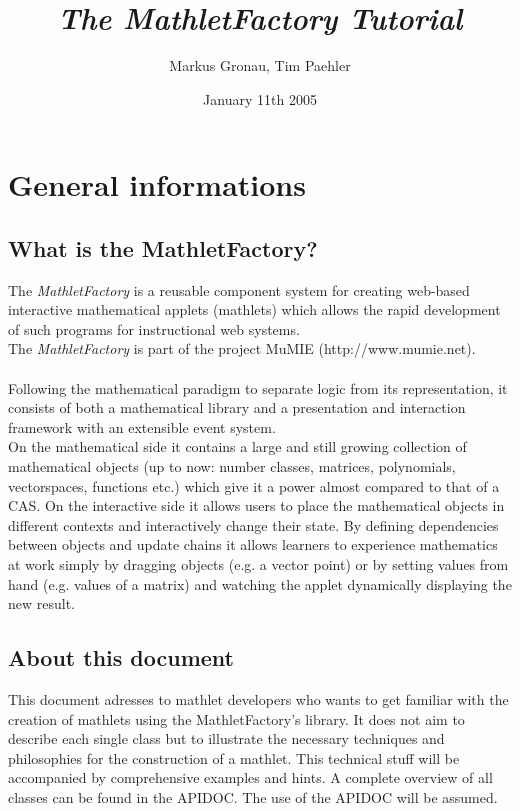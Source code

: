 \documentclass[a4paper,12pt]{book}
\title{\textit{The MathletFactory Tutorial}}
\date{January 11th 2005}
\author{Markus Gronau, Tim Paehler}
\begin{document}
\maketitle

\tableofcontents 

\chapter{General informations}

\section{What is the MathletFactory?}
  
  The \textit{MathletFactory} is a reusable component system for creating web-based 
  interactive mathematical applets (mathlets) which allows the rapid development 
  of such programs for instructional web systems.\\
  The \textit{MathletFactory} is part of the project MuMIE (http://www.mumie.net).\\\\
  Following the mathematical paradigm to separate logic from its representation, 
  it consists of both a mathematical library and a presentation and interaction 
  framework with an extensible event system.\\
  On the mathematical side it contains a large and still growing collection of 
  mathematical objects (up to now: number classes, matrices, polynomials, 
  vectorspaces, functions etc.) which give it a power almost compared to that of a 
  CAS. On the interactive side it allows users to place the mathematical objects 
  in different contexts and interactively change their state. By defining 
  dependencies between objects and update chains it allows learners to experience 
  mathematics at work simply by dragging objects (e.g. a vector point) or by 
  setting values from hand (e.g. values of a matrix) and watching the applet 
  dynamically displaying the new result.

\section{About this document}
  This document adresses to mathlet developers who wants to get familiar with the creation
  of mathlets using the MathletFactory's library. It does not aim to describe each
  single class but to illustrate the necessary techniques and philosophies for the 
  construction of a mathlet. This technical stuff will be accompanied by 
  comprehensive examples and hints. A complete overview of all classes can be found
  in the APIDOC. The use of the APIDOC will be assumed.
\end{document}
